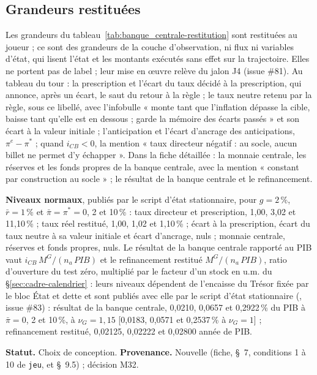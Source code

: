 \documentclass[11pt,a4paper]{article}
\newcommand{\code}[1]{\texttt{\detokenize{#1}}}
\begin{document}
\subsection{Grandeurs restituées}
\label{sec:banque_centrale-restitution}
\begin{proposee}
Les grandeurs du tableau~\ref{tab:banque_centrale-restitution} sont restituées au joueur ; ce sont des grandeurs de la couche d'observation, ni flux ni variables d'état, qui lisent l'état et les montants exécutés sans effet sur la trajectoire. Elles ne portent pas de label ; leur mise en œuvre relève du jalon J4 (issue \#81). Au tableau du tour : la prescription et l'écart du taux décidé à la prescription, qui annonce, après un écart, le saut du retour à la règle ; le taux neutre retenu par la règle, sous ce libellé, avec l'infobulle « monte tant que l'inflation dépasse la cible, baisse tant qu'elle est en dessous ; garde la mémoire des écarts passés » et son écart à la valeur initiale ; l'anticipation et l'écart d'ancrage des anticipations, $\pi^e - \pi^\ast$ ; quand $i_{\mathit{CB}} < 0$, la mention « taux directeur négatif : au socle, aucun billet ne permet d'y échapper ». Dans la fiche détaillée : la monnaie centrale, les réserves et les fonds propres de la banque centrale, avec la mention « constant par construction au socle » ; le résultat de la banque centrale et le refinancement.

\textbf{Niveaux normaux}, publiés par le script d'état stationnaire, pour $g = 2\,\%$, $\bar r = 1\,\%$ et $\bar\pi = \pi^\ast = 0$, 2 et 10\,\% : taux directeur et prescription, 1,00, 3,02 et 11,10\,\% ; taux réel restitué, 1,00, 1,02 et 1,10\,\% ; écart à la prescription, écart du taux neutre à sa valeur initiale et écart d'ancrage, nuls ; monnaie centrale, réserves et fonds propres, nuls. Le résultat de la banque centrale rapporté au PIB vaut $i_{\mathit{CB}}\,M^G/(n_a\,\mathit{PIB})$ et le refinancement restitué $M^G/(n_a\,\mathit{PIB})$, ratio d'ouverture du test zéro, multiplié par le facteur d'un stock en u.m. du \S\ref{sec:cadre-calendrier} : leurs niveaux dépendent de l'encaisse du Trésor fixée par le bloc État et dette et sont publiés avec elle par le script d'état stationnaire (\code{outils/etat_stationnaire.py}, issue \#83) : résultat de la banque centrale, 0,0210, 0,0657 et 0,2922\,\% du PIB à $\bar\pi = 0$, 2 et 10\,\%, à $\nu_G = 1{,}15$ [0,0183, 0,0571 et 0,2537\,\% à $\nu_G = 1$] ; refinancement restitué, 0,02125, 0,02222 et 0,02800 année de PIB.

\textbf{Statut.} Choix de conception. \textbf{Provenance.} Nouvelle (fiche, \S~7, conditions 1 à 10 de \texttt{jeu}, et \S~9.5) ; décision M32.
\end{proposee}
\end{document}

